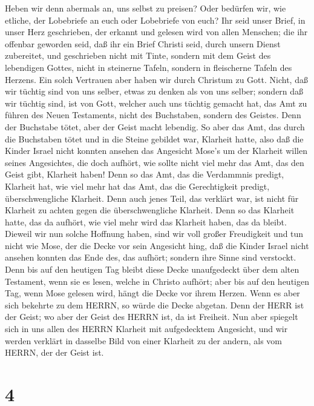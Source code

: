  Heben wir denn abermals an, uns selbst zu preisen? Oder
bedürfen wir, wie etliche, der Lobebriefe an euch oder Lobebriefe von
euch?  Ihr seid unser Brief, in unser Herz geschrieben, der
erkannt und gelesen wird von allen Menschen;  die ihr
offenbar geworden seid, daß ihr ein Brief Christi seid, durch unsern
Dienst zubereitet, und geschrieben nicht mit Tinte, sondern mit dem
Geist des lebendigen Gottes, nicht in steinerne Tafeln, sondern in
fleischerne Tafeln des Herzens.  Ein solch Vertrauen aber
haben wir durch Christum zu Gott.  Nicht, daß wir tüchtig
sind von uns selber, etwas zu denken als von uns selber; sondern daß wir
tüchtig sind, ist von Gott,  welcher auch uns tüchtig
gemacht hat, das Amt zu führen des Neuen Testaments, nicht des
Buchstaben, sondern des Geistes. Denn der Buchstabe tötet, aber der
Geist macht lebendig.  So aber das Amt, das durch die
Buchstaben tötet und in die Steine gebildet war, Klarheit hatte, also
daß die Kinder Israel nicht konnten ansehen das Angesicht Mose's um der
Klarheit willen seines Angesichtes, die doch aufhört,  wie
sollte nicht viel mehr das Amt, das den Geist gibt, Klarheit haben!
 Denn so das Amt, das die Verdammnis predigt, Klarheit hat,
wie viel mehr hat das Amt, das die Gerechtigkeit predigt,
überschwengliche Klarheit.  Denn auch jenes Teil, das
verklärt war, ist nicht für Klarheit zu achten gegen die
überschwengliche Klarheit.  Denn so das Klarheit hatte, das
da aufhört, wie viel mehr wird das Klarheit haben, das da bleibt.
 Dieweil wir nun solche Hoffnung haben, sind wir voll
großer Freudigkeit  und tun nicht wie Mose, der die Decke
vor sein Angesicht hing, daß die Kinder Israel nicht ansehen konnten das
Ende des, das aufhört;  sondern ihre Sinne sind verstockt.
Denn bis auf den heutigen Tag bleibt diese Decke unaufgedeckt über dem
alten Testament, wenn sie es lesen, welche in Christo aufhört;
 aber bis auf den heutigen Tag, wenn Mose gelesen wird,
hängt die Decke vor ihrem Herzen.  Wenn es aber sich
bekehrte zu dem HERRN, so würde die Decke abgetan.  Denn
der HERR ist der Geist; wo aber der Geist des HERRN ist, da ist
Freiheit.  Nun aber spiegelt sich in uns allen des HERRN
Klarheit mit aufgedecktem Angesicht, und wir werden verklärt in dasselbe
Bild von einer Klarheit zu der andern, als vom HERRN, der der Geist ist.

\hypertarget{section-3}{%
\section{4}\label{section-3}}

